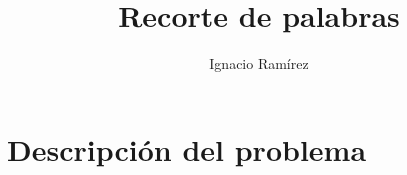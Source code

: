 \documentclass[11pt,a4paper]{article}
\author{Ignacio Ramírez}
\title{Recorte de palabras}
\begin{document}
\maketitle


\section{Descripción del problema}
\end{document}
